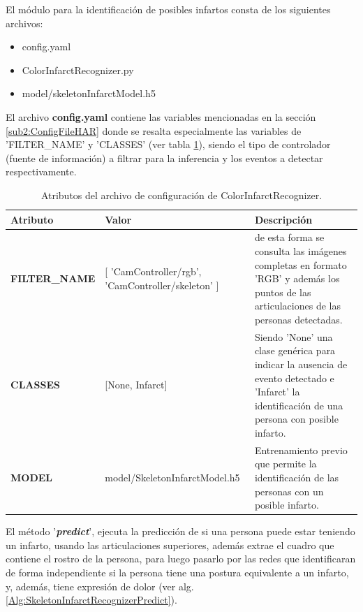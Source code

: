         El módulo para la identificación de posibles infartos consta de los siguientes archivos:
        
        \begin{itemize}
            \item config.yaml
            \item ColorInfarctRecognizer.py
            \item model/skeletonInfarctModel.h5
        \end{itemize}
        
        El archivo \textbf{config.yaml} contiene las variables mencionadas en la sección \ref{sub2:ConfigFileHAR} donde se resalta especialmente las variables de 'FILTER\_NAME' y 'CLASSES' (ver tabla \ref{Tab:ConfigFileSkeleton}), siendo el tipo de controlador (fuente de información) a filtrar para la inferencia y los eventos a detectar respectivamente.
        
        \begin{table}[ht!]
        \caption[Archivo de configuración de SkeletonInfarctRecognizer]{Atributos del archivo de configuración de ColorInfarctRecognizer.}
        \label{Tab:ConfigFileSkeleton}
        \centering
        \begin{tabular}{ | l p{5cm} p{6cm} | } 
            \hline
            \textbf{Atributo}       & \textbf{Valor} & \textbf{Descripción} \\ 
            \hline\hline
            \textbf{FILTER\_NAME}   & [ 'CamController/rgb', 'CamController/skeleton' ] & de esta forma se consulta las imágenes completas en formato 'RGB' y además los puntos de las articulaciones de las personas detectadas.\\
            \hline
            \textbf{CLASSES}  & [None, Infarct] & Siendo 'None' una clase genérica para indicar la ausencia de evento detectado e 'Infarct' la identificación de una persona con posible infarto.\\
            \hline
            \textbf{MODEL}        & model/SkeletonInfarctModel.h5  &  Entrenamiento previo que permite la identificación de las personas con un posible infarto.\\
            \hline
        \end{tabular}
        \end{table}
        
        El método '\textbf{\textit{predict}}', ejecuta la predicción de si una persona puede estar teniendo un infarto, usando las articulaciones superiores, además extrae el cuadro que contiene el rostro de la persona, para luego pasarlo por las redes que identificaran de forma independiente si la persona tiene una postura equivalente a un infarto, y, además, tiene expresión de dolor (ver alg. \ref{Alg:SkeletonInfarctRecognizerPredict}).
                
